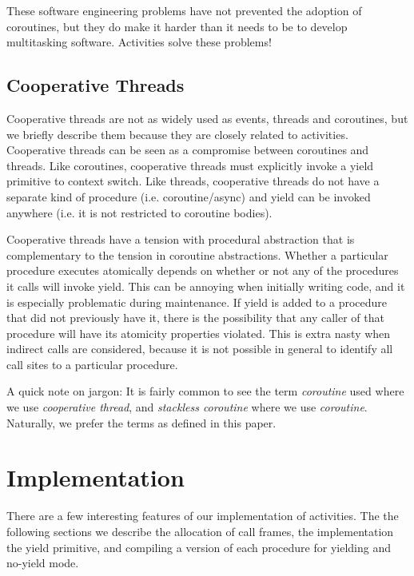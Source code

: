\documentclass[10pt,preprint]{sigplanconf}
\begin{document}


These software engineering problems have not prevented the adoption of coroutines, but they do make it harder than it needs to be to develop multitasking software.
Activities solve these problems!

\subsection{Cooperative Threads}

Cooperative threads are not as widely used as events, threads and coroutines, but we briefly describe them because they are closely related to activities.
Cooperative threads can be seen as a compromise between coroutines and threads.
Like coroutines, cooperative threads must explicitly invoke a yield primitive to context switch.
Like threads, cooperative threads do not have a separate kind of procedure (i.e. coroutine/async) and yield can be invoked anywhere (i.e. it is not restricted to coroutine bodies).

Cooperative threads have a tension with procedural abstraction that is complementary to the tension in coroutine abstractions.
Whether a particular procedure executes atomically depends on whether or not any of the procedures it calls will invoke yield.
This can be annoying when initially writing code, and it is especially problematic during maintenance.
If yield is added to a procedure that did not previously have it, there is the possibility that any caller of that procedure will have its atomicity properties violated.
This is extra nasty when indirect calls are considered, because it is not possible in general to identify all call sites to a particular procedure.

A quick note on jargon: It is fairly common to see the term \emph{coroutine} used where we use \emph{cooperative thread}, and \emph{stackless coroutine} where we use \emph{coroutine}.
Naturally, we prefer the terms as defined in this paper.


\section{Implementation}

There are a few interesting features of our implementation of activities.
The the following sections we describe the allocation of call frames, the implementation the yield primitive, and compiling a version of each procedure for yielding and no-yield mode.
\end{document}
